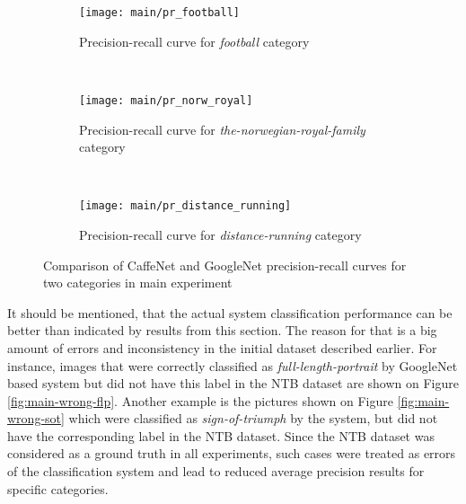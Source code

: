     \begin{figure}[h!]
        \centering
        \begin{subfigure}[a]{0.8\textwidth}
            \texttt{[image: main/pr\_football]}
            \caption{Precision-recall curve for \textit{football} category}
            \label{fig:main-pr-football}
        \end{subfigure}
        \\
        \begin{subfigure}[a]{0.8\textwidth}
            \texttt{[image: main/pr\_norw\_royal]}
            \caption{Precision-recall curve for \textit{the-norwegian-royal-family} category}
            \label{fig:main-pr-royal}
        \end{subfigure}
        \\
        \begin{subfigure}[a]{0.8\textwidth}
            \texttt{[image: main/pr\_distance\_running]}
            \caption{Precision-recall curve for \textit{distance-running} category}
            \label{fig:main-pr-distance-running}
        \end{subfigure}
        \caption{Comparison of CaffeNet and GoogleNet precision-recall curves for two categories in main experiment}
        \label{main-pr}
    \end{figure}
    
    It should be mentioned, that the actual system classification performance can be better than indicated by results from this section. The reason for that is a big amount of errors and inconsistency in the initial dataset described earlier. For instance, images that were correctly classified as \textit{full-length-portrait} by GoogleNet based system but did not have this label in the NTB dataset are shown on Figure \ref{fig:main-wrong-flp}. Another example is the pictures shown on Figure \ref{fig:main-wrong-sot} which were classified as \textit{sign-of-triumph} by the system, but did not have the corresponding label in the NTB dataset. Since the NTB dataset was considered as a ground truth in all experiments, such cases were treated as errors of the classification system and lead to reduced average precision results for specific categories.
    
